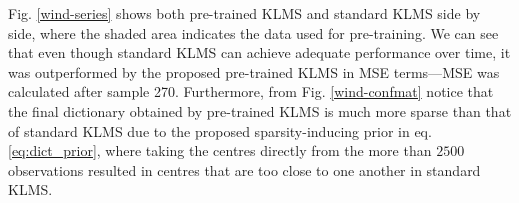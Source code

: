 


Fig. \ref{wind-series} shows both pre-trained KLMS and standard KLMS side by side, where the shaded area indicates the data used for pre-training. We can see that even though standard KLMS can achieve adequate performance over time, it was outperformed by the proposed pre-trained KLMS in MSE terms---{MSE was calculated after sample 270}. Furthermore, from Fig. \ref{wind-confmat} notice that the final dictionary obtained by pre-trained KLMS is much more sparse than that of standard KLMS due to the proposed sparsity-inducing prior in eq. \eqref{eq:dict_prior}, where taking the centres directly from the more than $2500$ observations resulted in centres that are too close to one another in standard KLMS.

